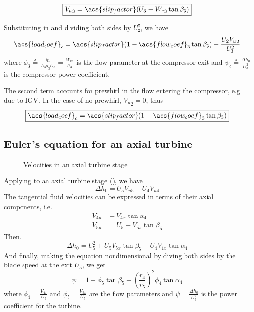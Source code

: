 \begin{equation}
    \label{eqn:V_u_3_corrected}
    \boxed{{V_u}_3 = \acs{slip_factor}(U_3 - {W_r}_3 \tan\beta_3)}
\end{equation}

Substituting  in  and dividing both sides by ${U_3^2}$, we have
\begin{equation}
    \acs{load_coef}_c = \acs{slip_factor}(1-\acs{flow_coef}_3\tan\beta_3) - \frac{U_2 {V_u}_2}{U_3^2} 
\end{equation}
where $\phi_3 \triangleq \frac{\dot{m}}{A_3 \rho_3 U_3} = \frac{W_{r3}}{U_3}$ is the flow parameter at the compressor exit
and $\psi_c \triangleq \frac{\Delta h_0}{U_3^2}$ is the compressor power coefficient.

The second term accounts for prewhirl in the flow entering the compressor, e.g due to \ac{IGV}.
In the case of no prewhirl, ${V_u}_2 = 0$, thus 
\begin{equation}
    \label{eqn:euler_compressor}
    \boxed{\acs{load_coef}_c = \acs{slip_factor}(1-\acs{flow_coef}_3\tan\beta_3)}
\end{equation}

\subsection{Euler's equation for an axial turbine}

\begin{figure}[bp]
    \caption{Velocities in an axial turbine stage}
    \label{fig:turbine_euler}
    
\end{figure}

Applying  to an axial turbine stage (), we have
\begin{equation}
    \Delta h_0 = U_5V_{u5}-U_4V_{u4}
\end{equation}
The tangential fluid velocities can be expressed in terms of their axial components, i.e.\
\begin{align}
    V_{4u} &= V_{4x} \tan\alpha_4 \\
    V_{5u} &= U_5 + V_{5x} \tan\beta_5
\end{align}
Then,
\begin{equation}
    \Delta h_0 = U_5^2 + U_5 V_{5x}\tan\beta_5 - U_4 V_{4x}\tan\alpha_4
\end{equation}
And finally, making the equation nondimensional by diving both sides by the blade speed at the exit $U_5$, we get
\begin{equation}
    \boxed{\psi = 1 + \phi_5\tan\beta_5-\left(\frac{r_4}{r_5}\right)^2\phi_4\tan\alpha_4}
\end{equation}
where $\phi_4 = \frac{V_{4x}}{U_5}$ and $\phi_5 = \frac{V_{5x}}{U_5}$ are the flow parameters and
$\psi=\frac{\Delta h_0}{U_5^2}$ is the power coefficient for the turbine.

